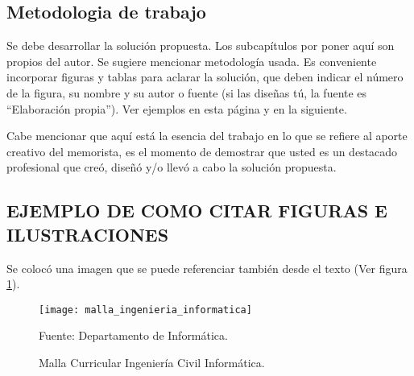 
\subsection{Metodologia de trabajo}

Se debe desarrollar la solución propuesta. Los subcapítulos por poner aquí son propios del autor. Se sugiere mencionar metodología usada. Es conveniente incorporar figuras y tablas para aclarar la solución, que deben indicar el número de la figura, su nombre y su autor o fuente (si las diseñas tú, la fuente es ``Elaboración propia''). Ver ejemplos en esta página y en la siguiente.

Cabe mencionar que aquí está la esencia del trabajo en lo que se refiere al aporte creativo del memorista, es el momento de demostrar que usted es un destacado profesional que creó, diseñó y/o llevó a cabo la solución propuesta.

\subsection{EJEMPLO DE COMO CITAR FIGURAS E ILUSTRACIONES}

Se colocó una imagen que se puede referenciar también desde el texto (Ver figura \ref{fig:malla}).

\begin{figure}[h]
\centering
\texttt{[image: malla\_ingenieria\_informatica]}
\caption{\label{fig:malla} Malla Curricular Ingeniería Civil Informática.} Fuente: Departamento de Informática.
\end{figure}

